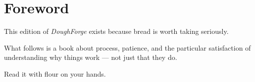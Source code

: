 \section{Foreword}\label{foreword}

This edition of \emph{DoughForge} exists because bread is worth taking
seriously.

What follows is a book about process, patience, and the particular
satisfaction of understanding why things work --- not just that they do.

Read it with flour on your hands.

